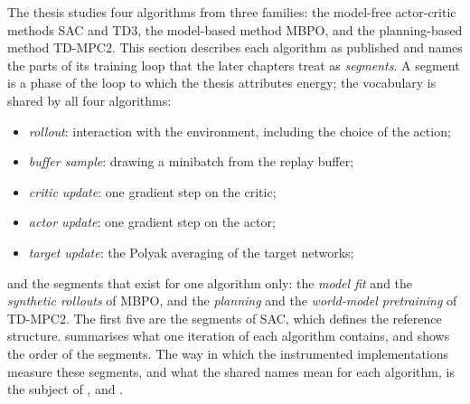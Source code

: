The thesis studies four algorithms from three families: the model-free actor-critic methods SAC and TD3, the model-based method MBPO, and the planning-based method TD-MPC2.
This section describes each algorithm as published and names the parts of its training loop that the later chapters treat as \emph{segments}.
A segment is a phase of the loop to which the thesis attributes energy; the vocabulary is shared by all four algorithms:
\begin{itemize}
  \item \emph{rollout}: interaction with the environment, including the choice of the action;
  \item \emph{buffer sample}: drawing a minibatch from the replay buffer;
  \item \emph{critic update}: one gradient step on the critic;
  \item \emph{actor update}: one gradient step on the actor;
  \item \emph{target update}: the Polyak averaging of the target networks;
\end{itemize}
and the segments that exist for one algorithm only: the \emph{model fit} and the \emph{synthetic rollouts} of MBPO, and the \emph{planning} and the \emph{world-model pretraining} of TD-MPC2.
The first five are the segments of SAC, which defines the reference structure.
 summarises what one iteration of each algorithm contains, and  shows the order of the segments.
The way in which the instrumented implementations measure these segments, and what the shared names mean for each algorithm, is the subject of ,  and .

